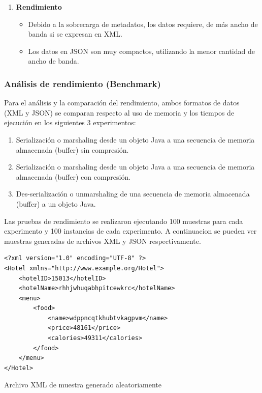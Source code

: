 \begin{enumerate}
    \item \textbf{Rendimiento}
    \begin{itemize}
        \item Debido a la sobrecarga de metadatos, los datos requiere, de más ancho de banda si se expresan en XML.
        \item Los datos en JSON son muy compactos, utilizando la menor cantidad de ancho de banda.
    \end{itemize}
    
\end{enumerate}


\subsubsection{Análisis de rendimiento (Benchmark)}
Para el análisis y la comparación del rendimiento, ambos formatos de datos (XML y JSON) se comparan respecto al uso de memoria y los tiempos de ejecución en los siguientes 3 experimentos:
\begin{enumerate}
    \item Serialización o marshaling desde un objeto Java a una secuencia de memoria almacenada (buffer) sin compresión.
    \item Serialización o marshaling desde un objeto Java a una secuencia de memoria almacenada (buffer) con compresión.
    \item Des-serialización o unmarshaling de una secuencia de memoria almacenada (buffer) a un objeto Java.
\end{enumerate}

Las pruebas de rendimiento se realizaron ejecutando 100 muestras para cada experimento y 100 instancias de cada experimento. A continuacion se pueden ver muestras generadas de archivos XML y JSON respectivamente.

\begin{verbatim}
<?xml version="1.0" encoding="UTF-8" ?> 
<Hotel xmlns="http://www.example.org/Hotel">
    <hotelID>15013</hotelID>
    <hotelName>rhhjwhuqabhpitcewkrc</hotelName> 
    <menu> 
        <food> 
            <name>wdppncqtkhubtvkagpvm</name> 
            <price>48161</price> 
            <calories>49311</calories>
        </food>
    </menu>
</Hotel>
\end{verbatim}
\begin{center}
\caption{Archivo XML de muestra generado aleatoriamente}
\end{center}

